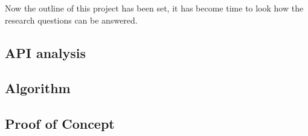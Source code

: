 

Now the outline of this project has been set, it has become time to look how the research questions can be answered. 

\subsection{API analysis}

\subsection{Algorithm}


\subsection{Proof of Concept}

